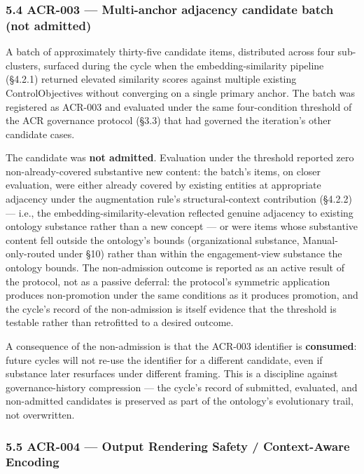 \documentclass[
]{article}
\begin{document}
\subsubsection{5.4 ACR-003 --- Multi-anchor adjacency candidate batch
(not
admitted)}\label{acr-003-multi-anchor-adjacency-candidate-batch-not-admitted}

A batch of approximately thirty-five candidate items, distributed across
four sub-clusters, surfaced during the cycle when the
embedding-similarity pipeline (§4.2.1) returned elevated similarity
scores against multiple existing ControlObjectives without converging on
a single primary anchor. The batch was registered as ACR-003 and
evaluated under the same four-condition threshold of the ACR governance
protocol (§3.3) that had governed the iteration's other candidate cases.

The candidate was \textbf{not admitted}. Evaluation under the threshold
reported zero non-already-covered substantive new content: the batch's
items, on closer evaluation, were either already covered by existing
entities at appropriate adjacency under the augmentation rule's
structural-context contribution (§4.2.2) --- i.e., the
embedding-similarity-elevation reflected genuine adjacency to existing
ontology substance rather than a new concept --- or were items whose
substantive content fell outside the ontology's bounds (organizational
substance, Manual-only-routed under §10) rather than within the
engagement-view substance the ontology bounds. The non-admission outcome
is reported as an active result of the protocol, not as a passive
deferral: the protocol's symmetric application produces non-promotion
under the same conditions as it produces promotion, and the cycle's
record of the non-admission is itself evidence that the threshold is
testable rather than retrofitted to a desired outcome.

A consequence of the non-admission is that the ACR-003 identifier is
\textbf{consumed}: future cycles will not re-use the identifier for a
different candidate, even if substance later resurfaces under different
framing. This is a discipline against governance-history compression ---
the cycle's record of submitted, evaluated, and non-admitted candidates
is preserved as part of the ontology's evolutionary trail, not
overwritten.

\subsubsection{5.5 ACR-004 --- Output Rendering Safety / Context-Aware
Encoding}\label{acr-004-output-rendering-safety-context-aware-encoding}
\end{document}
